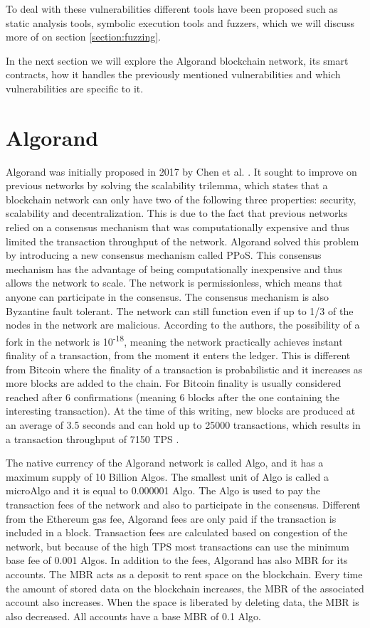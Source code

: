 To deal with these vulnerabilities different tools have been proposed such as static analysis tools, symbolic execution tools and fuzzers, which we will discuss more of on section \ref{section:fuzzing}.

In the next section we will explore the Algorand blockchain network, its smart contracts, how it handles the previously mentioned vulnerabilities and which vulnerabilities are specific to it.

\section{Algorand} \label{section:algorand}
Algorand was initially proposed in 2017 by Chen et al. \cite{chen_algorand_2017}. It sought to improve on previous networks by solving the scalability trilemma, which states that a blockchain network can only have two of the following three properties: security, scalability and decentralization. This is due to the fact that previous networks relied on a consensus mechanism that was computationally expensive and thus limited the transaction throughput of the network. Algorand solved this problem by introducing a new consensus mechanism called \ac{PPoS}. This consensus mechanism has the advantage of being computationally inexpensive and thus allows the network to scale. The network is permissionless, which means that anyone can participate in the consensus. The consensus mechanism is also Byzantine fault tolerant. The network can still function even if up to 1/3 of the nodes in the network are malicious. According to the authors, the possibility of a fork in the network is 10\textsuperscript{-18}, meaning the network practically achieves instant finality of a transaction, from the moment it enters the ledger. This is different from Bitcoin where the finality of a transaction is probabilistic and it increases as more blocks are added to the chain. For Bitcoin finality is usually considered reached after 6 confirmations (meaning 6 blocks after the one containing the interesting transaction). At the time of this writing, new blocks are produced at an average of 3.5 seconds and can hold up to 25000 transactions, which results in a transaction throughput of 7150 \ac{TPS} \cite{noauthor_algorand_nodate-3}.

The native currency of the Algorand network is called Algo, and it has a maximum supply of 10 Billion Algos. The smallest unit of Algo is called a microAlgo and it is equal to 0.000001 Algo. The Algo is used to pay the transaction fees of the network and also to participate in the consensus. Different from the Ethereum gas fee, Algorand fees are only paid if the transaction is included in a block. Transaction fees are calculated based on congestion of the network, but because of the high TPS most transactions can use the minimum base fee of 0.001 Algos. In addition to the fees, Algorand has also \ac{MBR} for its accounts. The \ac{MBR} acts as a deposit to rent space on the blockchain. Every time the amount of stored data on the blockchain increases, the \ac{MBR} of the associated account also increases. When the space is liberated by deleting data, the \ac{MBR} is also decreased. All accounts have a base \ac{MBR} of 0.1 Algo.

